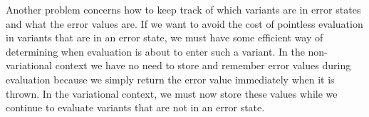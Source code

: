 \documentclass[letterpaper,10pt,onecolumn]{article}
\begin{document}
Another problem concerns how to keep track of which variants are in error states and what
the error values are. If we want to avoid the cost of pointless evaluation in variants that are in an error
state, we must have some efficient way of determining when evaluation is about to enter such a variant.
In the non-variational context we have no need to store and remember error values during evaluation
because we simply return the error value immediately when it is thrown. In the variational context, we
must now store these values while we continue to evaluate variants that are not in an error state.



\end{document}

